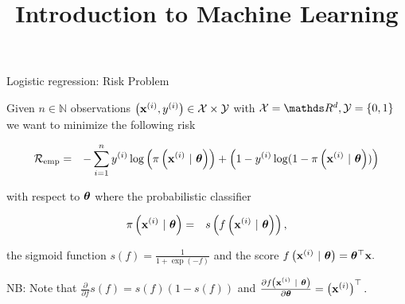 \documentclass[11pt,compress,t,notes=noshow, xcolor=table]{beamer}
\title{Introduction to Machine Learning}
\begin{document}
    

\begin{vbframe}{Logistic regression: Risk Problem}

Given $n \in \mathbb{N}$ observations $\left(\mathbf{x}^{(i)}, y^{(i)}\right) \in \mathcal{X} \times \mathcal{Y}$ with  $\Xspace = \R^d, \Yspace = \{0, 1\}$ we want to minimize the following risk 


\vspace*{-0.5cm}

\begin{eqnarray*}
  \mathcal{R}_{\text{emp}}  & = & 
  -\sum^n_{i=1} y^{(i)}\log\left(\pi\left(\mathbf{x}^{(i)} ~|~ \bm{\theta}\right)\right) + \left(1-y^{(i)}\log(1-\pi\left(\mathbf{x}^{(i)} ~|~ \bm{\theta}\right))\right)
\end{eqnarray*}

with respect to $\bm{\theta}$ where the probabilistic classifier

\begin{eqnarray*}
  \pi\left(\mathbf{x}^{(i)} ~|~ \bm{\theta}\right)  & = & 
 s\left(f\left(\mathbf{x}^{(i)} ~|~ \bm{\theta}\right)\right),
\end{eqnarray*}

the sigmoid function $s(f) = \frac{1}{1 + \exp(-f)}$ and the score $f\left(\mathbf{x}^{(i)} ~|~ \bm{\theta}\right) = \bm{\theta}^\top \mathbf{x}.$

\vspace*{0.5cm} 

NB: Note that $\frac{\partial}{\partial f} s(f) = s(f)(1-s(f))$ and $\frac{\partial f\left(\mathbf{x}^{(i)} ~|~ \bm{\theta}\right)}{\partial \bm{\theta}} = \left(\mathbf{x}^{(i)}\right)^\top.$

\end{vbframe}
\end{document}
